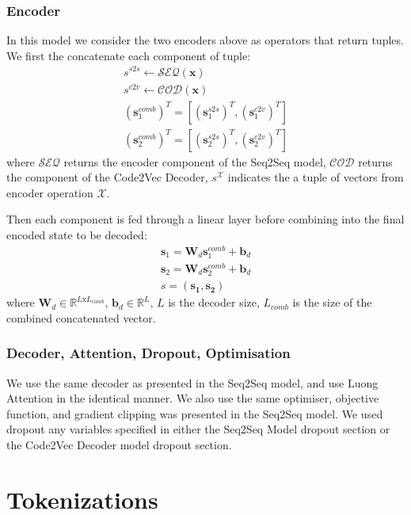\subsubsection{Encoder}

In this model we consider the two encoders above as operators that return tuples. We first the concatenate each component of tuple:
\begin{align}
    s^{s2s}  \gets \mathcal{SEQ}(\mathbf{x}) \\
    s^{c2v} \gets \mathcal{COD}(\mathbf{x}) \\
    (\mathbf{s}_1^{comb})^T = [ (\mathbf{s}^{s2s}_1)^T , (\mathbf{s}^{c2v}_1)^T ] \\
    (\mathbf{s}_2^{comb})^T  =  [ (\mathbf{s}^{s2s}_2)^T , (\mathbf{s}^{c2v}_2)^T ]  
\end{align}
where $\mathcal{SEQ}$ returns the encoder component of the Seq2Seq model,
$\mathcal{COD}$ returns the component of the Code2Vec Decoder, 
$s^\mathcal{X}$ indicates the a tuple of vectors from encoder operation $\mathcal{X}$.

Then each component is fed through a linear layer before combining into the final encoded state to be decoded:
\begin{align}
    \mathbf{s}_1 = \mathbf{W}_d\mathbf{s}^{comb}_1 + \mathbf{b}_d\\
    \mathbf{s}_2 = \mathbf{W}_d\mathbf{s}^{comb}_2 + \mathbf{b}_d\\
    s = (\mathbf{s_1}, \mathbf{s_2})
\end{align}
where $\mathbf{W}_d \in \mathbb{R}^{L\text{x}L_{comb}}$, 
$\mathbf{b}_d \in \mathbb{R}^{L}$,
$L$ is the decoder size,
$L_{comb}$ is the size of the combined concatenated vector.


\subsubsection{Decoder, Attention, Dropout, Optimisation}
We use the same decoder as presented in the Seq2Seq model, and use Luong Attention in the identical manner.
We also use the same optimiser, objective function, and gradient clipping was presented in the Seq2Seq model.
We used dropout any variables specified in either the Seq2Seq Model dropout section or the Code2Vec Decoder model dropout section.


\section{Tokenizations} %
\label{sec:tokenizations}

